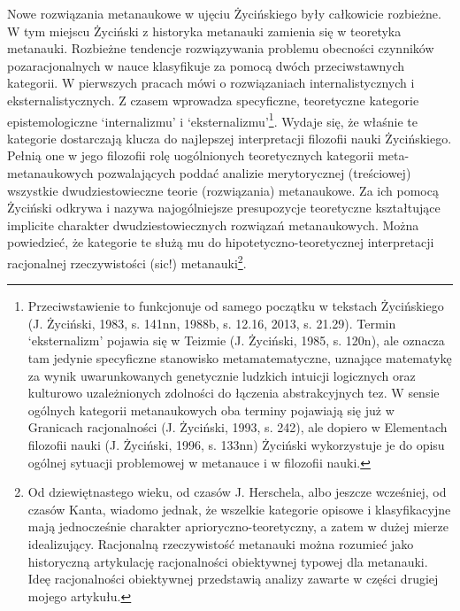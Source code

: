 \documentclass{article}
\begin{document}
Nowe rozwiązania metanaukowe w ujęciu Życińskiego były całkowicie rozbieżne. W tym miejscu Życiński z historyka
metanauki zamienia się w teoretyka metanauki. Rozbieżne tendencje rozwiązywania problemu obecności czynników
pozaracjonalnych w nauce klasyfikuje za pomocą dwóch przeciwstawnych kategorii. W pierwszych pracach mówi o
rozwiązaniach internalistycznych i eksternalistycznych. Z czasem wprowadza specyficzne, teoretyczne kategorie
epistemologiczne ‘internalizmu’ i ‘eksternalizmu’\footnote{Przeciwstawienie to funkcjonuje od samego początku w
tekstach Życińskiego \label{ref:RNDhYHdk6Gn9I}(J. Życiński, 1983, s. 141nn, 1988b, s. 12.16, 2013, s. 21.29). Termin
‘eksternalizm’ pojawia się w Teizmie \label{ref:RNDqnijmYbBgM}(J. Życiński, 1985, s. 120n), ale oznacza tam jedynie
specyficzne stanowisko metamatematyczne, uznające matematykę za wynik uwarunkowanych genetycznie ludzkich intuicji
logicznych oraz kulturowo uzależnionych zdolności do łączenia abstrakcyjnych tez. W sensie ogólnych kategorii
metanaukowych oba terminy pojawiają się już w Granicach racjonalności \label{ref:RND37pLqxd4Aa}(J. Życiński, 1993, s.
242), ale dopiero w Elementach filozofii nauki \label{ref:RNDY1V0zunmmK}(J. Życiński, 1996, s. 133nn) Życiński
wykorzystuje je do opisu ogólnej sytuacji problemowej w metanauce i w filozofii nauki.}. Wydaje się, że właśnie te
kategorie dostarczają klucza do najlepszej interpretacji filozofii nauki Życińskiego. Pełnią one w jego filozofii rolę
uogólnionych teoretycznych kategorii meta-metanaukowych pozwalających poddać analizie merytorycznej (treściowej)
wszystkie dwudziestowieczne teorie (rozwiązania) metanaukowe. Za ich pomocą Życiński odkrywa i nazywa najogólniejsze
presupozycje teoretyczne kształtujące implicite charakter dwudziestowiecznych rozwiązań metanaukowych. Można
powiedzieć, że kategorie te służą mu do hipotetyczno-teoretycznej interpretacji racjonalnej rzeczywistości (sic!)
metanauki\footnote{Od dziewiętnastego wieku, od czasów J. Herschela, albo jeszcze wcześniej, od czasów Kanta, wiadomo
jednak, że wszelkie kategorie opisowe i klasyfikacyjne mają jednocześnie charakter aprioryczno-teoretyczny, a zatem w
dużej mierze idealizujący. Racjonalną rzeczywistość metanauki można rozumieć jako historyczną artykulację racjonalności
obiektywnej typowej dla metanauki. Ideę racjonalności obiektywnej przedstawią analizy zawarte w części drugiej mojego
artykułu.}.
\end{document}
